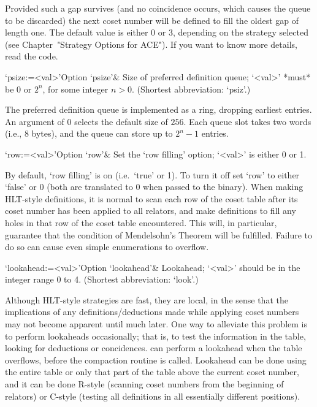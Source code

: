 Provided such a gap survives (and no coincidence occurs, which  causes
the queue to be discarded) the next coset number will  be  defined  to
fill the oldest gap of length one. The default value is either 0 or 3,
depending on the strategy selected (see Chapter~"Strategy Options  for
ACE"). If you want to know more details, read the code.


\>`psize:=<val>'{Option `psize'}&
Size of preferred definition queue; `<val>' *must* be 0 or $2^n$,  for
some integer $n>0$. (Shortest abbreviation: `psiz'.)

The  preferred definition  queue is  implemented as  a  ring, dropping
earliest entries. An argument of 0 selects  the default size of $256$.
Each  queue slot takes two words (i.e., 8 bytes),  and the  queue  can
store up to $2^n-1$ entries.

\enditems


\beginitems

\>`row:=<val>'{Option `row'}&
Set the \lq{}row filling' option; `<val>' is either 0 or 1.

By default, \lq{}row filling' is on (i.e.~`true' or 1). To turn it off
set `row' to either `false' or 0 (both are translated to 0 when passed
to  the {\ACE}  binary).   When making  HLT-style  definitions, it  is
normal to scan each row of  the coset table after its coset number has
been applied to  all relators, and make definitions  to fill any holes
in that row of the  coset table encountered. This will, in particular,
guarantee  that   the  condition  of  Mendelsohn's   Theorem  will  be
fulfilled.  Failure  to do  so can cause  even simple  enumerations to
overflow.

\>`lookahead:=<val>'{Option `lookahead'}&
Lookahead; `<val>' should be in the integer range 0 to 4.
(Shortest abbreviation: `look'.)
  
Although HLT-style strategies are fast, they are local, in  the  sense
that  the  implications  of  any  definitions/deductions  made   while
applying coset numbers may not become apparent until much  later.  One
way to alleviate this problem is to perform  lookaheads  occasionally;
that is, to test the information in the table, looking for  deductions
or  concidences.  {\ACE}  can  perform  a  lookahead  when  the  table
overflows, before the compaction routine is called. Lookahead  can  be
done using the entire table or only that part of the table  above  the
current coset number, and it  can  be  done  R-style  (scanning  coset
numbers from the  beginning  of  relators)  or  C-style  (testing  all
definitions in all essentially different positions).

